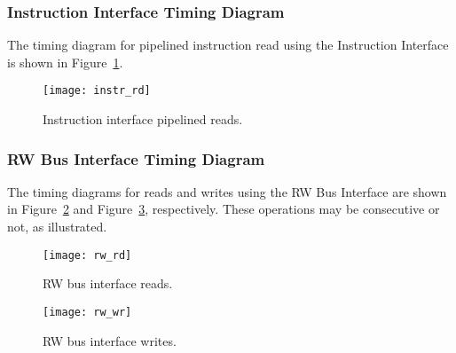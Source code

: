 \subsubsection{Instruction Interface Timing Diagram}
\label{sec:instrird}

The timing diagram for pipelined instruction read using the
Instruction Interface is shown in Figure~\ref{fig:instrird}.

\begin{figure}[htbp]
    \centerline{\texttt{[image: instr\_rd]}}
    \vspace{0cm}\caption{Instruction interface pipelined reads.}
    \label{fig:instrird}
\end{figure}

\subsubsection{RW Bus Interface Timing Diagram}
\label{sec:rwi}

The timing diagrams for reads and writes using the RW Bus Interface
are shown in Figure~\ref{fig:rwird} and Figure~\ref{fig:rwiwr},
respectively. These operations may be consecutive or not, as
illustrated.

\begin{figure}[htbp]
    \centerline{\texttt{[image: rw\_rd]}}
    \vspace{0cm}\caption{RW bus interface reads.}
    \label{fig:rwird}
\end{figure}

\begin{figure}[htbp]
    \centerline{\texttt{[image: rw\_wr]}}
    \vspace{0cm}\caption{RW bus interface writes.}
    \label{fig:rwiwr}
\end{figure}

